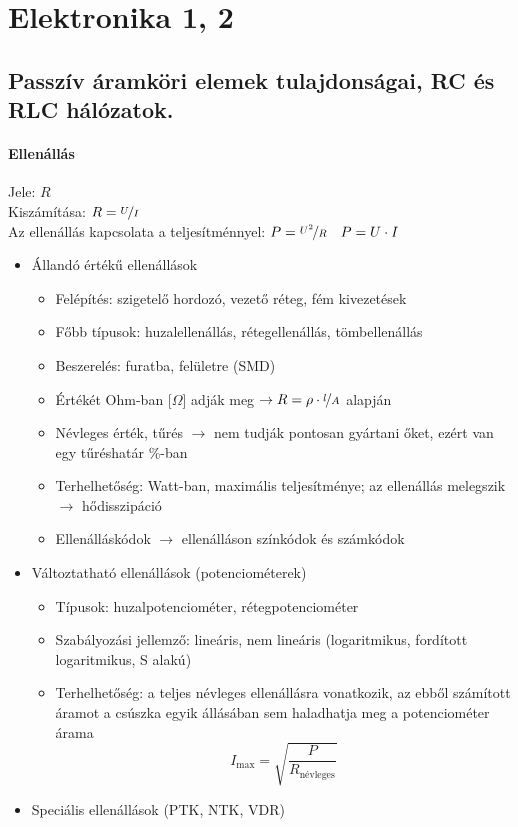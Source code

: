\section{Elektronika 1, 2}
\subsection{Passzív áramköri elemek tulajdonságai, RC és RLC hálózatok.}
\paragraph{Ellenállás}
Jele: $R$\\
Kiszámítása: $R = \nicefrac{U}{I}$\\
Az ellenállás kapcsolata a teljesítménnyel: $P=\nicefrac{U^2}{R}\quad P=U \cdot I$\\
\begin{itemize}[nosep]
	\item Állandó értékű ellenállások
	\begin{itemize}[nosep]
		\item Felépítés: szigetelő hordozó, vezető réteg, fém kivezetések
		\item Főbb típusok: huzalellenállás, rétegellenállás, tömbellenállás
		\item Beszerelés: furatba, felületre (SMD)
		\item Értékét Ohm-ban [$\Omega$] adják meg  $\rightarrow R = \rho \cdot \nicefrac{l}{A}$ alapján
		\item Névleges érték, tűrés $\rightarrow$ nem tudják pontosan gyártani őket, ezért van egy tűréshatár \%-ban
		\item Terhelhetőség: Watt-ban, maximális teljesítménye; az ellenállás melegszik $\rightarrow$ hődisszipáció
		\item Ellenálláskódok $\rightarrow$ ellenálláson színkódok és számkódok
	\end{itemize}
	\item Változtatható ellenállások (potenciométerek)
	\begin{itemize}[nosep]
		\item Típusok: huzalpotenciométer, rétegpotenciométer
		\item Szabályozási jellemző: lineáris, nem lineáris (logaritmikus, fordított logaritmikus, S alakú)
		\item Terhelhetőség: a teljes névleges ellenállásra vonatkozik, az ebből számított áramot a csúszka egyik állásában sem haladhatja meg a potenciométer árama $$I_{\max} = \sqrt{\frac{P}{R_\text{névleges}}}$$
	\end{itemize}
	\item Speciális ellenállások (PTK, NTK, VDR)
\end{itemize}

